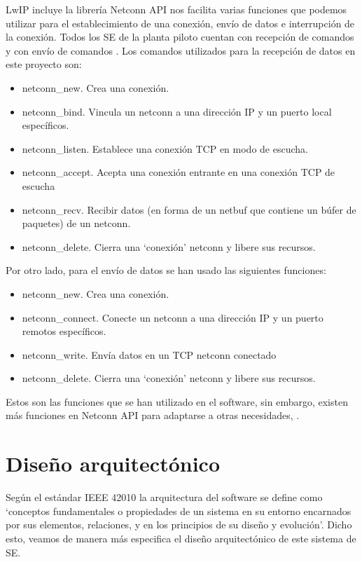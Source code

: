 LwIP incluye la librería Netconn API \cite{nonGNU} nos facilita varias funciones que podemos utilizar para el establecimiento de una conexión, envío de datos e interrupción de la conexión. Todos los SE de la planta piloto cuentan con recepción de comandos  y con envío de comandos . Los comandos utilizados para la recepción de datos en este proyecto son:
\begin{itemize}
\item netconn\_new. Crea una conexión.
\item netconn\_bind. Vincula un netconn a una dirección IP y un puerto local específicos.
\item netconn\_listen. Establece una conexión TCP en modo de escucha.
\item netconn\_accept. Acepta una conexión entrante en una conexión TCP de escucha
\item netconn\_recv. Recibir datos (en forma de un netbuf que contiene un búfer de paquetes) de un netconn.
\item netconn\_delete. Cierra una `conexión' netconn y libere sus recursos.
\end{itemize}

Por otro lado, para el envío de datos se han usado las siguientes funciones:
\begin{itemize}
\item netconn\_new. Crea una conexión.
\item netconn\_connect. Conecte un netconn a una dirección IP y un puerto remotos específicos.
\item netconn\_write. Envía datos en un TCP netconn conectado
\item netconn\_delete. Cierra una `conexión' netconn y libere sus recursos.
\end{itemize}

Estos son las funciones que se han utilizado en el software, sin embargo, existen más funciones en Netconn API para adaptarse a otras necesidades, \cite{NetconnAPI}.

\section{Diseño arquitectónico}
Según el estándar IEEE 42010 \cite{IEEE291482018} la arquitectura del software se define como `conceptos fundamentales o propiedades de un sistema en su entorno encarnados por sus elementos, relaciones, y en los principios de su diseño y evolución'. Dicho esto, veamos de manera más especifica el diseño arquitectónico de este sistema de SE.

